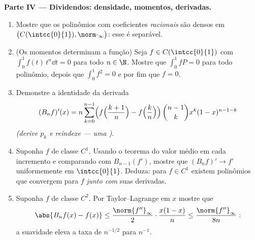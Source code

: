 \begin{problem}
\medskip
\noindent\textbf{Parte IV --- Dividendos: densidade, momentos,
derivadas.}
\begin{enumerate}[resume]
  \item Mostre que os polinômios com coeficientes \emph{racionais}
        são densos em $\bigl(C(\intcc{0}{1}),
        \norm\cdot_\infty\bigr)$: esse  é
        separável.
  \item (Os momentos determinam a função) Seja $f \in
        C(\intcc{0}{1})$ com $\int_0^1 f(t)\,t^n \dd t = 0$
        para todo $n \in \N$. Mostre que $\int_0^1 f P = 0$ para todo
        polinômio, depois que $\int_0^1 f^2 = 0$ e por fim que $f = 0$.
  \item Demonstre a identidade da derivada
        \[
        (B_nf)'(x) = n\sum_{k=0}^{n-1}\Bigl(
        f\Bigl(\frac{k+1}{n}\Bigr) -
        f\Bigl(\frac kn\Bigr)\Bigr)\,
        \binom{n-1}{k}x^k(1-x)^{n-1-k}
        \]
        \emph{(derive $p_k$ e reindexe --- uma )}.
  \item Suponha $f$ de classe $C^1$. Usando o teorema do valor médio em
        cada incremento e comparando com $B_{n-1}(f')$, mostre que
        $(B_nf)' \to f'$ uniformemente em $\intcc{0}{1}$. Deduza:
        para $f \in C^1$ existem polinômios que convergem para $f$
        \emph{junto com} suas derivadas.
  \item Suponha $f$ de classe $C^2$. Por Taylor--Lagrange em $x$ mostre que
        \[
        \abs{B_nf(x) - f(x)} \leq
        \frac{\norm{f''}_\infty}{2}\cdot\frac{x(1-x)}{n}
        \leq \frac{\norm{f''}_\infty}{8n} :
        \]
        a suavidade eleva a taxa de $n^{-1/2}$ para
        $n^{-1}$.
\end{enumerate}


\end{problem}
